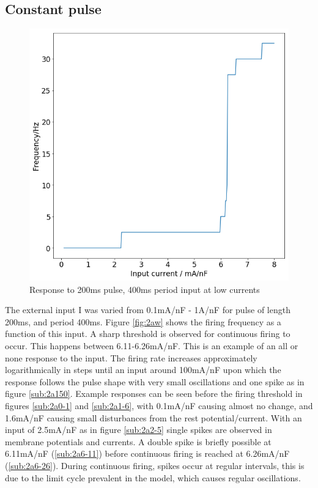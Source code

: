 \documentclass[twoside,twocolumn]{article}
\begin{document}
\subsection{ Constant pulse}





\begin{figure}[h]
  \centering
    \includegraphics[width=\linewidth]{fd1}
  \caption{Response to 200ms pulse, 400ms period input at low currents}
  \label{fig:2al}
\end{figure}


The external input I was varied from 0.1mA/nF - 1A/nF for pulse of length 200ms, and period 400ms. Figure \ref{fig:2aw} shows the firing frequency as a function of this input. A sharp threshold is observed for continuous firing to occur. This happens between 6.11-6.26mA/nF. This is an example of an all or none response to the input. The firing rate increases approximately logarithmically in steps until an input around 100mA/nF upon which the response follows the pulse shape with very small oscillations and one spike as in figure \ref{sub:2a150}. Example responses can be seen before the firing threshold in figures \ref{sub:2a0-1} and  \ref{sub:2a1-6}, with 0.1mA/nF causing almost no change, and 1.6mA/nF causing small disturbances from the rest potential/current. With an input of 2.5mA/nF as in figure \ref{sub:2a2-5} single spikes are observed in membrane potentials and currents. A double spike is briefly possible at 6.11mA/nF (\ref{sub:2a6-11}) before continuous firing is reached at 6.26mA/nF (\ref{sub:2a6-26}). During continuous firing, spikes occur at regular intervals, this is due to the limit cycle prevalent in the model, which causes regular oscillations.
\end{document}

